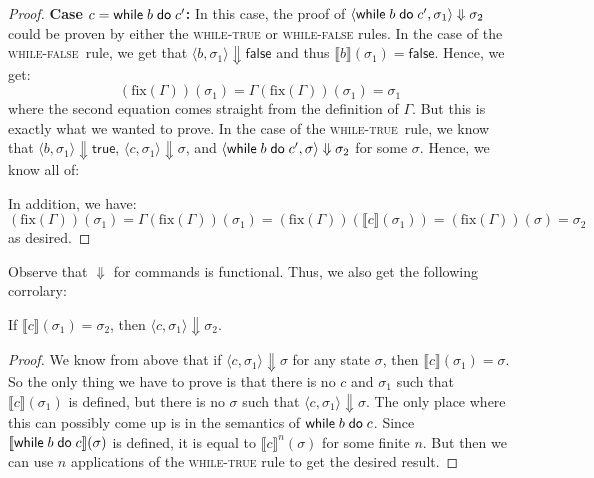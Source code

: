 \documentclass{lecturenotes}
\newcommand{\while}[2]{\ensuremath{\textsf{while}\mkern5mu#1 \mathrel{\textsf{do}} #2}}
\newcommand{\itrue}{\textsf{true}}
\newcommand{\ifalse}{\textsf{false}}
\begin{document}
\begin{proof}
  \noindent\textbf{Case $c = \while{b}{c'}$:}
  In this case, the proof of $\langle \while{b}{c'}, \sigma_1 \rangle \Downarrow \sigma_2$ could be proven by either the \textsc{while-true} or \textsc{while-false} rules.
  In the case of the \textsc{while-false}~rule, we get that $\langle b, \sigma_1 \rangle \Downarrow \ifalse$ and thus $\llbracket b \rrbracket(\sigma_1) = \ifalse$.
      Hence, we get:
  $$(\text{fix}(\Gamma))(\sigma_1) = \Gamma(\text{fix}(\Gamma))(\sigma_1) = \sigma_1$$
  where the second equation comes straight from the definition of $\Gamma$.
  But this is exactly what we wanted to prove.
  In the case of the \textsc{while-true}~rule, we know that $\langle b, \sigma_1 \rangle \Downarrow \itrue$, $\langle c ,\sigma_1 \rangle \Downarrow \sigma$, and $\langle \while{b}{c'}, \sigma \rangle \Downarrow \sigma_2$ for some $\sigma$.
  Hence, we know all of:
  In addition, we have:
  $$(\text{fix}(\Gamma))(\sigma_1) = \Gamma(\text{fix}(\Gamma))(\sigma_1) = (\text{fix}(\Gamma))(\llbracket c \rrbracket(\sigma_1)) = (\text{fix}(\Gamma))(\sigma) = \sigma_2$$
  as desired.
\end{proof}

Observe that $\Downarrow$ for commands is functional.
Thus, we also get the following corrolary:

\begin{cor}
  If $\llbracket c \rrbracket(\sigma_1) = \sigma_2$, then $\langle c, \sigma_1 \rangle \Downarrow \sigma_2$.
\end{cor}
\begin{proof}
  We know from above that if $\langle c, \sigma_1 \rangle \Downarrow \sigma$ for any state $\sigma$, then $\llbracket c \rrbracket(\sigma_1) = \sigma$.
  So the only thing we have to prove is that there is no $c$ and $\sigma_1$ such that $\llbracket c \rrbracket(\sigma_1)$ is defined, but there is no $\sigma$ such that $\langle c, \sigma_1 \rangle \Downarrow \sigma$.
  The only place where this can possibly come up is in the semantics of $\while{b}{c}$.
  Since $\llbracket \while{b}{c} \rrbracket(\sigma)$ is defined, it is equal to $\llbracket c \rrbracket^n(\sigma)$ for some finite $n$.
  But then we can use $n$ applications of the \textsc{while-true} rule to get the desired result.
\end{proof}
\end{document}
